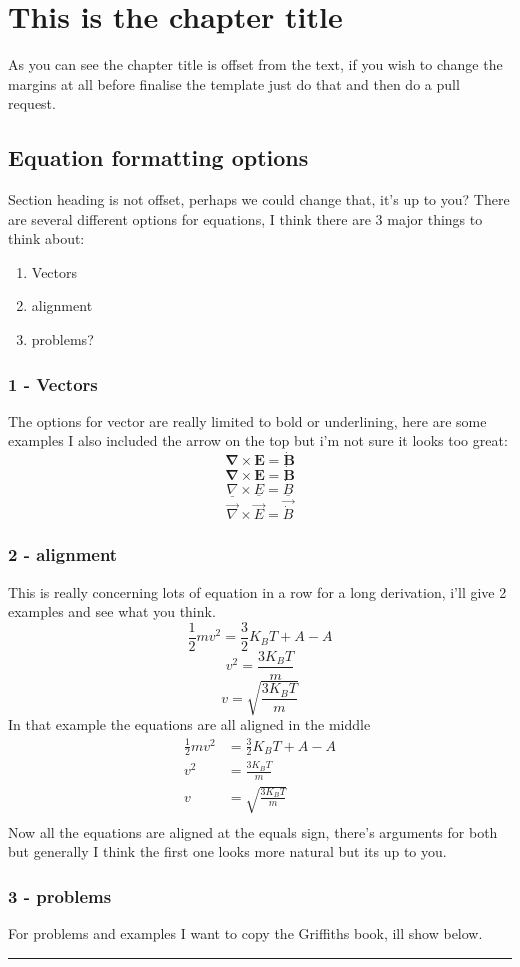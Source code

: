 \documentclass[11pt]{memoir}
\begin{document}
\chapter{This is the chapter title}
As you can see the chapter title is offset from the text, if you wish to change the margins at all before finalise the template just do that and then do a pull request.
\section{Equation formatting options}
Section heading is not offset, perhaps we could change that, it's up to you? There are several different options for equations, I think there are 3 major things to think about:
\begin{enumerate}
	\item Vectors
	\item alignment
	\item problems?
\end{enumerate}
\subsection{1 - Vectors}
The options for vector are really limited to bold or underlining, here are some examples I also included the arrow on the top but i'm not sure it looks too great:
$$\mathbf{\nabla}\times\mathbf{E} = \mathbf{\dot{B}}$$
$$\pmb{\nabla}\times\pmb{E} = \pmb{\dot{B}}$$
$$\underline{\nabla}\times\underline{E} = \underline{\dot{B}}$$
$$\vec{\nabla}\times\vec{E} = \vec{\dot{B}}$$
\subsection{2 - alignment}
This is really concerning lots of equation in a row for a long derivation, i'll give 2 examples and see what you think.
$$\frac{1}{2}mv^2=\frac{3}{2}K_BT + A - A$$
$$v^2=\frac{3K_BT}{m}$$
$$v=\sqrt{\frac{3K_BT}{m}}$$
In that example the equations are all aligned in the middle
\begin{align*}
\frac{1}{2}mv^2&=\frac{3}{2}K_BT + A - A\\
v^2&=\frac{3K_BT}{m}\\
v&=\sqrt{\frac{3K_BT}{m}}\\
\end{align*}
Now all the equations are aligned at the equals sign, there's arguments for both but generally I think the first one looks more natural but its up to you.
\subsection{3 - problems}
For problems and examples I want to copy the Griffiths book, ill show below.\\
\noindent\rule[0.2ex]{\linewidth}{0.1cm}
\end{document}
